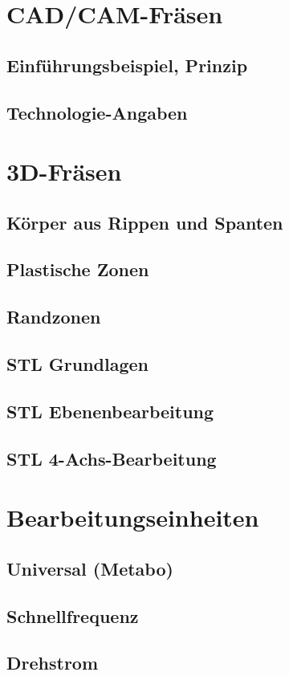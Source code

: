 \documentclass[a4paper]{book}
\begin{document}
	\section{CAD/CAM-Fräsen} 
		\subsection{Einführungsbeispiel, Prinzip} 
		\subsection{Technologie-Angaben} 
	\section{3D-Fräsen}
		\subsection{Körper aus Rippen und Spanten} 
		\subsection{Plastische Zonen} 
		\subsection{Randzonen} 
		\subsection{STL Grundlagen} 
		\subsection{STL Ebenenbearbeitung} 
		\subsection{STL 4-Achs-Bearbeitung}
	\section{Bearbeitungseinheiten} 
		\subsection{Universal (Metabo)} 
		\subsection{Schnellfrequenz} 
		\subsection{Drehstrom} 	 
\end{document}
